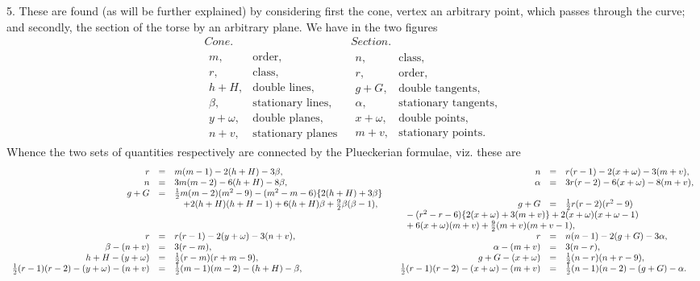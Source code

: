 \documentclass[11pt,a4paper]{article}
\newcommand{\half}{\tfrac{1}{2}}
\begin{document}
5. These are found (as will be further explained) by considering first the cone,
vertex an arbitrary point, which passes through the curve; and secondly, the section
of the torse by an arbitrary plane. We have in the two figures
\[
\begin{array}{c|c}
\textit{Cone.} & \textit{Section.}\\
\begin{array}{rl}
m,&\text{order,}\\
r,&\text{class,}\\
h+H,&\text{double lines,}\\
\beta,&\text{stationary lines,}\\
y+\omega,&\text{double planes,}\\
n+v,&\text{stationary planes}
\end{array}
&
\begin{array}{rl}
n,&\text{class,}\\
r,&\text{order,}\\
g+G,&\text{double tangents,}\\
\alpha,&\text{stationary tangents,}\\
x+\omega,&\text{double points,}\\
m+v,&\text{stationary points.}
\end{array}
\end{array}
\]
Whence the two sets of quantities respectively are connected by the Plueckerian
formulae, viz. these are
\begingroup\tiny\setlength{\arraycolsep}{1pt}
\[
\begin{array}{rcl@{\qquad}rcl}
r&=&m(m-1)-2(h+H)-3\beta,
&
n&=&r(r-1)-2(x+\omega)-3(m+v),\\
n&=&3m(m-2)-6(h+H)-8\beta,
&
\alpha&=&3r(r-2)-6(x+\omega)-8(m+v),\\
g+G&=&\half m(m-2)(m^2-9)
-(m^2-m-6)\{2(h+H)+3\beta\}\\
&&\quad+2(h+H)(h+H-1)+6(h+H)\beta+\tfrac92\beta(\beta-1),
&
g+G&=&\half r(r-2)(r^2-9)\\
&&&\multicolumn{3}{l}{
{}-(r^2-r-6)\{2(x+\omega)+3(m+v)\}
+2(x+\omega)(x+\omega-1)}\\
&&&\multicolumn{3}{l}{
{}+6(x+\omega)(m+v)+\tfrac92(m+v)(m+v-1),}\\
r&=&r(r-1)-2(y+\omega)-3(n+v),
&
r&=&n(n-1)-2(g+G)-3\alpha,\\
\beta-(n+v)&=&3(r-m),
&
\alpha-(m+v)&=&3(n-r),\\
h+H-(y+\omega)&=&\half(r-m)(r+m-9),
&
g+G-(x+\omega)&=&\half(n-r)(n+r-9),\\
\half(r-1)(r-2)-(y+\omega)-(n+v)
&=&\half(m-1)(m-2)-(h+H)-\beta,
&
\half(r-1)(r-2)-(x+\omega)-(m+v)
&=&\half(n-1)(n-2)-(g+G)-\alpha.
\end{array}
\]
\endgroup
\end{document}
